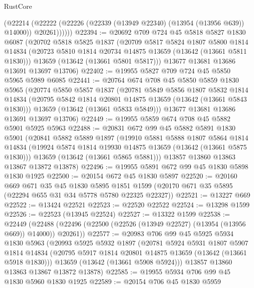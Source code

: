 \begin{lexlean}{RustCore}
\begin{coremodule}
            (@22214
              (@22222 (@22226 (@22339 (@13949 @22340) (@13954 (@13956 @639)) @14000)) @20261))))))
@22394 := @20692
    @709
    @724
    @45
    @5818
    @5827
    @1830
    @6087
    (@20702
      @5818
      @5825
      @1837
      (@20709
        @5817
        @5824
        @1807
        @5800
        @1814
        @14834
        (@20723 @5810 @1814 @20734 @14875 @13659 (@13642 (@13661 @5811 @1830)))
        @13659
        (@13642 (@13661 @5801 @5817)))
      @13677
      @13681
      @13686
      @13691
      @13697
      @13706)
@22402 := @19955 @5827 @709 @724 @45 @5850 @5965 @5989 @6085
@22441 := @20764
    @674
    @708
    @45
    @5850
    @5859
    @1830
    @5965
    (@20774
      @5850
      @5857
      @1837
      (@20781
        @5849
        @5856
        @1807
        @5832
        @1814
        @14834
        (@20795 @5842 @1814 @20801 @14875 @13659 (@13642 (@13661 @5843 @1830)))
        @13659
        (@13642 (@13661 @5833 @5849)))
      @13677
      @13681
      @13686
      @13691
      @13697
      @13706)
@22449 := @19955 @5859 @674 @708 @45 @5882 @5901 @5925 @5963
@22488 := @20831
    @672
    @99
    @45
    @5882
    @5891
    @1830
    @5901
    (@20841
      @5882
      @5889
      @1897
      (@19910
        @5881
        @5888
        @1807
        @5864
        @1814
        @14834
        (@19924 @5874 @1814 @19930 @14875 @13659 (@13642 (@13661 @5875 @1830)))
        @13659
        (@13642 (@13661 @5865 @5881)))
      @13857
      @13860
      @13863
      @13867
      @13872
      @13878)
@22496 := @19955 @5891 @672 @99 @45 @1830 @5898 @1830 @1925
@22500 := @20154 @672 @45 @1830 @5897
@22520 := @20160
    @669
    @671
    @35
    @45
    @1830
    @5895
    @1851
    @1599
    (@20170 @671 @35 @5895 (@22294 @655 @31 @34 @5778 @5780 @22325 @22327))
@22521 := @13227 @669
@22522 := @13424 @22521
@22523 := @22520 @22522
@22524 := @13298 @1599
@22526 := @22523 (@13945 @22524)
@22527 := @13322 @1599
@22538 := @22449
    (@22488 (@22496 (@22500 (@22526 (@13949 @22527) (@13954 (@13956 @669)) @14000)) @20261))
@22577 := @20983
    @706
    @99
    @45
    @5925
    @5934
    @1830
    @5963
    (@20993
      @5925
      @5932
      @1897
      (@20781
        @5924
        @5931
        @1807
        @5907
        @1814
        @14834
        (@20795 @5917 @1814 @20801 @14875 @13659 (@13642 (@13661 @5918 @1830)))
        @13659
        (@13642 (@13661 @5908 @5924)))
      @13857
      @13860
      @13863
      @13867
      @13872
      @13878)
@22585 := @19955 @5934 @706 @99 @45 @1830 @5960 @1830 @1925
@22589 := @20154 @706 @45 @1830 @5959

\end{coremodule}
\end{lexlean}
